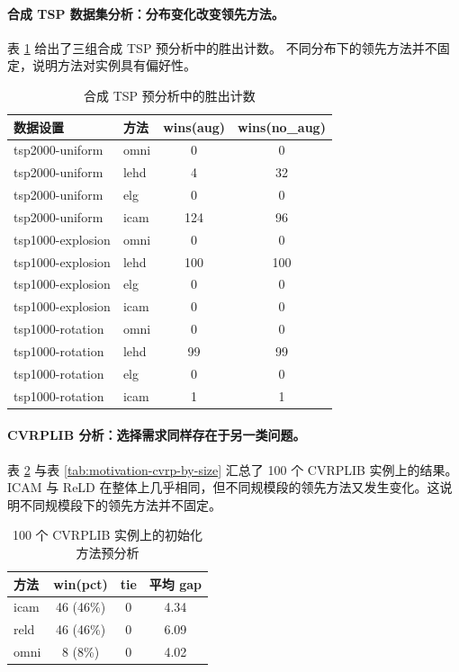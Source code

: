 \paragraph{合成 TSP 数据集分析：分布变化改变领先方法。}
表 \ref{tab:motivation-synth-tsp} 给出了三组合成 TSP 预分析中的胜出计数。
不同分布下的领先方法并不固定，说明方法对实例具有偏好性。

\begin{table}[htb]
  \centering
  \caption{合成 TSP 预分析中的胜出计数}
  \label{tab:motivation-synth-tsp}
  \small
  \begin{tabular}{llcc}
    \toprule
    数据设置 & 方法 & wins(aug) & wins(no\_aug) \\
    \midrule
    tsp2000-uniform    & omni & 0   & 0  \\
    tsp2000-uniform    & lehd & 4   & 32 \\
    tsp2000-uniform    & elg  & 0   & 0  \\
    tsp2000-uniform    & icam & 124 & 96 \\
    \midrule
    tsp1000-explosion  & omni & 0   & 0  \\
    tsp1000-explosion  & lehd & 100 & 100 \\
    tsp1000-explosion  & elg  & 0   & 0  \\
    tsp1000-explosion  & icam & 0   & 0  \\
    \midrule
    tsp1000-rotation   & omni & 0   & 0  \\
    tsp1000-rotation   & lehd & 99  & 99 \\
    tsp1000-rotation   & elg  & 0   & 0  \\
    tsp1000-rotation   & icam & 1   & 1  \\
    \bottomrule
  \end{tabular}
\end{table}

\paragraph{CVRPLIB 分析：选择需求同样存在于另一类问题。}
表 \ref{tab:motivation-cvrp-overall} 与表 \ref{tab:motivation-cvrp-by-size} 
汇总了 100 个 CVRPLIB 实例上的结果。
ICAM 与 ReLD 在整体上几乎相同，但不同规模段的领先方法又发生变化。这说明不同规模段下的领先方法并不固定。

\begin{table}[htb]
  \centering
  \caption{100 个 CVRPLIB 实例上的初始化方法预分析}
  \label{tab:motivation-cvrp-overall}
  \small
  \begin{tabular}{lccc}
    \toprule
    方法 & win(pct) & tie & 平均 gap \\
    \midrule
    icam & 46 (46\%) & 0 & 4.34 \\
    reld & 46 (46\%) & 0 & 6.09 \\
    omni & 8 (8\%)   & 0 & 4.02 \\
    \bottomrule
  \end{tabular}
\end{table}

